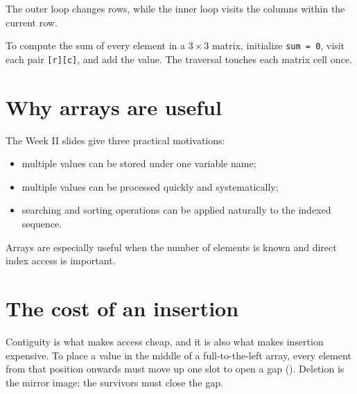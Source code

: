 The outer loop changes rows, while the inner loop visits the columns within the current row.

\begin{workedexample}
To compute the sum of every element in a $3\times3$ matrix, initialize \texttt{sum = 0}, visit each pair \texttt{[r][c]}, and add the value. The traversal touches each matrix cell once.
\end{workedexample}

\section{Why arrays are useful}

The Week II slides give three practical motivations:

\begin{itemize}
  \item multiple values can be stored under one variable name;
  \item multiple values can be processed quickly and systematically;
  \item searching and sorting operations can be applied naturally to the indexed sequence.
\end{itemize}

Arrays are especially useful when the number of elements is known and direct index access is important.

\section{The cost of an insertion}

Contiguity is what makes access cheap, and it is also what makes insertion expensive.
To place a value in the middle of a full-to-the-left array, every element from that
position onwards must move up one slot to open a gap
(). Deletion is the mirror image: the survivors must close the gap.

